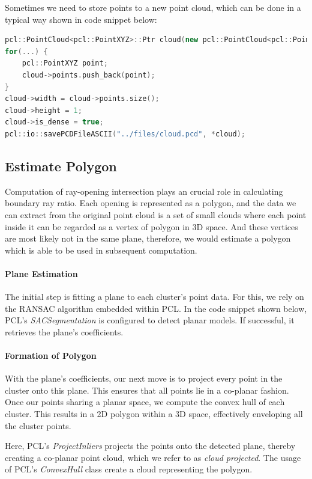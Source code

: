\documentclass[11pt, a4paper,oneside,chapterprefix=false]{scrbook}
\begin{document}
Sometimes we need to store points to a new point cloud, which can be done in a typical way shown in code snippet below:

\begin{lstlisting}[language=C++, caption=Save Point Cloud Data]
pcl::PointCloud<pcl::PointXYZ>::Ptr cloud(new pcl::PointCloud<pcl::PointXYZ>);
for(...) {
    pcl::PointXYZ point;
    cloud->points.push_back(point);
}
cloud->width = cloud->points.size();
cloud->height = 1;
cloud->is_dense = true;
pcl::io::savePCDFileASCII("../files/cloud.pcd", *cloud);
\end{lstlisting}

\subsection{Estimate Polygon}

Computation of ray-opening intersection plays an crucial role in calculating boundary ray ratio. Each opening is represented as a polygon, and the data we can extract from the original point cloud is a set of small clouds where each point inside it can be regarded as a vertex of polygon in 3D space. And these vertices are most likely not in the same plane, therefore, we would estimate a polygon which is able to be used in subsequent computation. 

\paragraph{Plane Estimation}

The initial step is fitting a plane to each cluster's point data. For this, we rely on the RANSAC algorithm embedded within PCL. In the code snippet shown below, PCL's \textit{SACSegmentation} is configured to detect planar models. If successful, it retrieves the plane's coefficients.

\paragraph{Formation of Polygon}

With the plane's coefficients, our next move is to project every point in the cluster onto this plane. This ensures that all points lie in a co-planar fashion. Once our points sharing a planar space, we compute the convex hull of each cluster. This results in a 2D polygon within a 3D space, effectively enveloping all the cluster points.

Here, PCL's \textit{ProjectInliers} projects the points onto the detected plane, thereby creating a co-planar point cloud, which we refer to as \textit{cloud projected}. The usage of PCL's \textit{ConvexHull} class create a cloud representing the polygon.
\end{document}
